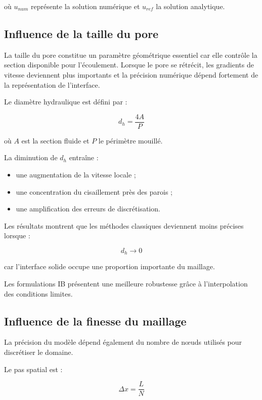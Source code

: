 \documentclass[12pt,a4paper]{report}
\begin{document}
où $u_{num}$ représente la solution numérique et $u_{ref}$ la solution analytique.

\subsection{Influence de la taille du pore}

La taille du pore constitue un paramètre géométrique essentiel car elle contrôle la section disponible pour l’écoulement. Lorsque le pore se rétrécit, les gradients de vitesse deviennent plus importants et la précision numérique dépend fortement de la représentation de l’interface.

Le diamètre hydraulique est défini par :

\begin{equation}
d_h
=
\frac{4A}{P}
\end{equation}

où $A$ est la section fluide et $P$ le périmètre mouillé.

La diminution de $d_h$ entraîne :

\begin{itemize}
\item une augmentation de la vitesse locale ;
\item une concentration du cisaillement près des parois ;
\item une amplification des erreurs de discrétisation.
\end{itemize}

Les résultats montrent que les méthodes classiques deviennent moins précises lorsque :

\begin{equation}
d_h \rightarrow 0
\end{equation}

car l’interface solide occupe une proportion importante du maillage.

Les formulations IB présentent une meilleure robustesse grâce à l’interpolation des conditions limites.

\subsection{Influence de la finesse du maillage}

La précision du modèle dépend également du nombre de nœuds utilisés pour discrétiser le domaine.

Le pas spatial est :

\begin{equation}
\Delta x
=
\frac{L}{N}
\end{equation}
\end{document}
